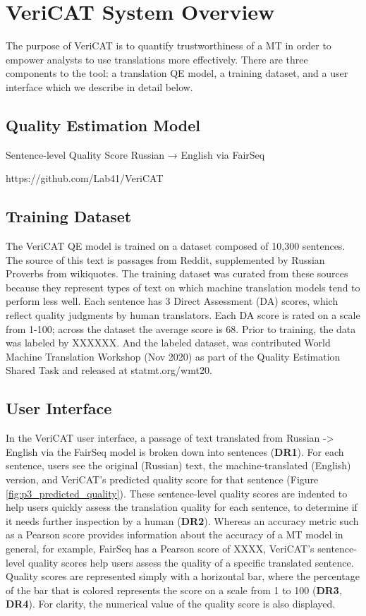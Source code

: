\section{VeriCAT System Overview}
The purpose of VeriCAT is to quantify trustworthiness of a MT in order to empower analysts to use translations more effectively. There are three components to the tool: a  translation QE model, a training dataset, and a user interface which we describe in detail below.

\subsection{Quality Estimation Model}

Sentence-level Quality Score
Russian → English via FairSeq

https://github.com/Lab41/VeriCAT

\subsection{Training Dataset}
The VeriCAT QE model is trained on a dataset composed of 10,300 sentences. The source of this text is passages from Reddit, supplemented by Russian Proverbs from wikiquotes. The training dataset was curated from these sources because they represent types of text on which machine translation models tend to perform less well. Each sentence has 3 Direct Assessment (DA) scores, which reflect quality judgments by human translators. Each DA score is rated on a scale from 1-100; across the dataset the average score is 68. Prior to training, the data was labeled by XXXXXX. And the labeled dataset, was contributed World Machine Translation Workshop (Nov 2020) as part of the Quality Estimation Shared Task and released at statmt.org/wmt20.  

\subsection{User Interface}
In the VeriCAT user interface, a passage of text translated from Russian -> English via the FairSeq model is broken down into sentences (\textbf{DR1}). For each sentence, users see the original (Russian) text, the machine-translated (English) version, and VeriCAT’s predicted quality score for that sentence (Figure \ref{fig:p3_predicted_quality}). These sentence-level quality scores are indented to help users quickly assess the translation quality for each sentence, to determine if it needs further inspection by a human (\textbf{DR2}). Whereas an accuracy metric such as a Pearson score provides information about the accuracy of a MT model in general, for example, FairSeq has a Pearson score of XXXX, VeriCAT’s sentence-level quality scores help users assess the quality of a specific translated sentence. Quality scores are represented simply with a horizontal bar, where the percentage of the bar that is colored represents the score on a scale from 1 to 100 (\textbf{DR3}, \textbf{DR4}). For clarity, the numerical value of the quality score is also displayed.  

